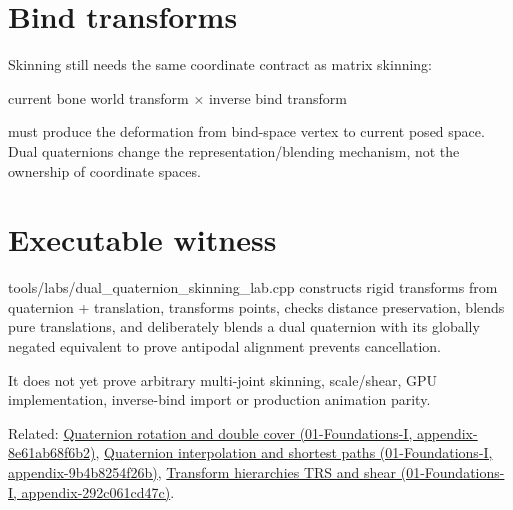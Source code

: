 \section{Bind transforms}\label{appendix-921f3f2efb53-bind-transforms}

Skinning still needs the same coordinate contract as matrix skinning:

current bone world transform × inverse bind transform

must produce the deformation from bind-space vertex to current posed space. Dual quaternions change the representation/blending mechanism, not the ownership of coordinate spaces.

\section{Executable witness}\label{appendix-921f3f2efb53-executable-witness}

tools/labs/dual\_quaternion\_skinning\_lab.cpp constructs rigid transforms from quaternion + translation, transforms points, checks distance preservation, blends pure translations, and deliberately blends a dual quaternion with its globally negated equivalent to prove antipodal alignment prevents cancellation.

It does not yet prove arbitrary multi-joint skinning, scale/shear, GPU implementation, inverse-bind import or production animation parity.

Related: \href{../01-Foundations-I/main.pdf\#nameddest=appendix-8e61ab68f6b2}{Quaternion rotation and double cover (01-Foundations-I, appendix-8e61ab68f6b2)}, \href{../01-Foundations-I/main.pdf\#nameddest=appendix-9b4b8254f26b}{Quaternion interpolation and shortest paths (01-Foundations-I, appendix-9b4b8254f26b)}, \href{../01-Foundations-I/main.pdf\#nameddest=appendix-292c061cd47c}{Transform hierarchies TRS and shear (01-Foundations-I, appendix-292c061cd47c)}.
